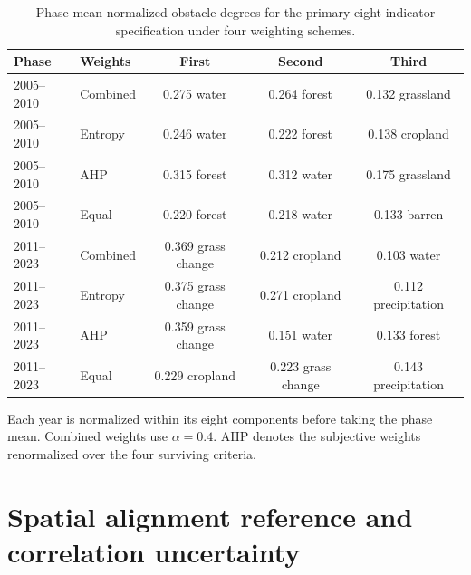 \documentclass[preprint,11pt,authoryear]{elsarticle}
\begin{document}
\begin{table}[htbp]
\centering
\caption{Phase-mean normalized obstacle degrees for the primary eight-indicator specification under four weighting schemes.}
\label{tab:obstacle-scheme}
\footnotesize
\setlength{\tabcolsep}{3pt}
\begin{tabular}{llccc}
\toprule
Phase & Weights & First & Second & Third \\
\midrule
2005--2010 & Combined & 0.275 water & 0.264 forest & 0.132 grassland \\
2005--2010 & Entropy & 0.246 water & 0.222 forest & 0.138 cropland \\
2005--2010 & AHP & 0.315 forest & 0.312 water & 0.175 grassland \\
2005--2010 & Equal & 0.220 forest & 0.218 water & 0.133 barren \\
2011--2023 & Combined & 0.369 grass change & 0.212 cropland & 0.103 water \\
2011--2023 & Entropy & 0.375 grass change & 0.271 cropland & 0.112 precipitation \\
2011--2023 & AHP & 0.359 grass change & 0.151 water & 0.133 forest \\
2011--2023 & Equal & 0.229 cropland & 0.223 grass change & 0.143 precipitation \\
\bottomrule
\end{tabular}

\vspace{2pt}
{\scriptsize Each year is normalized within its eight components before taking the phase mean. Combined weights use $\alpha=0.4$. AHP denotes the subjective weights renormalized over the four surviving criteria.}
\end{table}

\section{Spatial alignment reference and correlation uncertainty}
\label{app:spatialnull}
\end{document}
